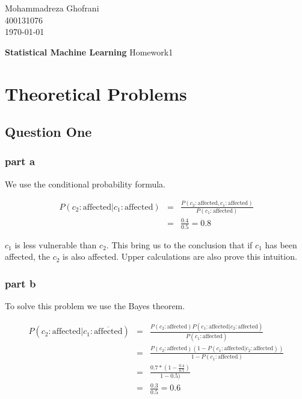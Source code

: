 \documentclass[12pt, a4paper]{book}
\newcommand{\coursetitle}{Statistical Machine Learning}
\newcommand{\doctitle}{Homework1}
\newcommand{\name}{Mohammadreza Ghofrani}
\newcommand{\studentno}{400131076}
\newcommand{\todaydate}{\today}
\begin{document}
\begin{flushright}
    \name \\
    \studentno \\
    \todaydate
\end{flushright}

\vspace*{0.5cm}

\begin{center}
    \huge
    \textbf{\coursetitle}
    \break
    \large
    \doctitle
\end{center}

\thispagestyle{plain}

\section*{Theoretical Problems}
\subsection*{Question One}

\subsubsection*{part a}

We use the conditional probability formula.

\begin{eqnarray*}
    P(c_2: \text{affected}| c_1: \text{affected}) & = & \frac{P(c_2:\text{affected}, c_1:\text{affected})}{P(c_1:\text{affected})} \\
    & = & \frac{0.4}{0.5} = 0.8
\end{eqnarray*}

$c_1$ is less vulnerable than $c_2$. This bring us to the conclusion that if $c_1$ has been affected, the
$c_2$ is also affected. Upper calculations are also prove this intuition.

\subsubsection*{part b}

To solve this problem we use the Bayes theorem.

\begin{eqnarray*}
    P(c_2: \text{affected}| c_1: \overline{\text{affected}}) & = & \frac{P(c_2:\text{affected}) P(c_1:\overline{\text{affected}}|c_2:\text{affected})}{P(c_1:\overline{\text{affected}})} \\
    & = & \frac{P(c_2:\text{affected}) (1-P(c_1:\text{affected}|c_2:\text{affected}))}{1 - P(c_1:\text{affected})} \\
    & = & \frac{0.7 * (1-\frac{0.4}{0.7})}{1 - 0.5)} \\
    & = & \frac{0.3}{0.5} = 0.6
\end{eqnarray*}
\end{document}
